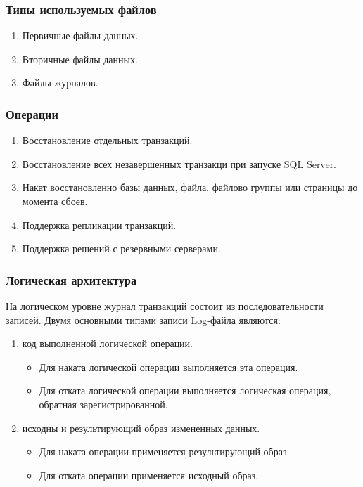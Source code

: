 \subsubsection{Типы используемых файлов}

\begin{enumerate}
	\item Первичные файлы данных.
	\item Вторичные файлы данных.
	\item Файлы журналов.
\end{enumerate}

\subsubsection{Операции}

\begin{enumerate}
	\item Восстановление отдельных транзакций.
	\item Восстановление всех незавершенных транзакци при запуске SQL Server.
	\item Накат восстановленно базы данных, файла, файлово группы или страницы до момента сбоев.
	\item Поддержка репликации транзакций.
	\item Поддержка решений с резервными серверами.
\end{enumerate}

\subsubsection{Логическая архитектура}

На логическом уровне журнал транзакций состоит из последовательности записей. Двумя основными типами записи Log-файла являются:

\begin{enumerate}
	\item код выполненной логической операции.
	\begin{itemize}
		\item Для наката логической операции выполняется эта операция.
		\item Для отката логической операции выполняется логическая операция, обратная зарегистрированной.
	\end{itemize}
	\item исходны и результирующий образ измененных данных.
	\begin{itemize}
		\item Для наката операции применяется результирующий образ.
		\item Для отката операции применяется исходный образ.
	\end{itemize}
\end{enumerate}

